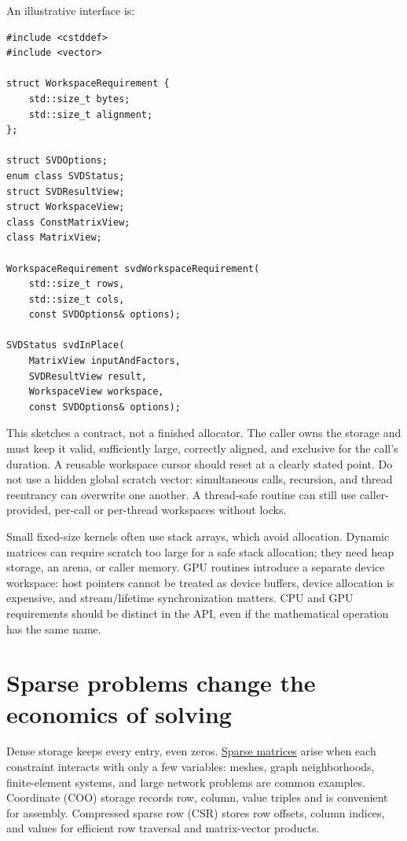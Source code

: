 An illustrative interface is:

\begin{verbatim}
#include <cstddef>
#include <vector>

struct WorkspaceRequirement {
    std::size_t bytes;
    std::size_t alignment;
};

struct SVDOptions;
enum class SVDStatus;
struct SVDResultView;
struct WorkspaceView;
class ConstMatrixView;
class MatrixView;

WorkspaceRequirement svdWorkspaceRequirement(
    std::size_t rows,
    std::size_t cols,
    const SVDOptions& options);

SVDStatus svdInPlace(
    MatrixView inputAndFactors,
    SVDResultView result,
    WorkspaceView workspace,
    const SVDOptions& options);
\end{verbatim}

This sketches a contract, not a finished allocator. The caller owns the storage and must keep it valid, sufficiently large, correctly aligned, and exclusive for the call's duration. A reusable workspace cursor should reset at a clearly stated point. Do not use a hidden global scratch vector: simultaneous calls, recursion, and thread reentrancy can overwrite one another. A thread-safe routine can still use caller-provided, per-call or per-thread workspaces without locks.

Small fixed-size kernels often use stack arrays, which avoid allocation. Dynamic matrices can require scratch too large for a safe stack allocation; they need heap storage, an arena, or caller memory. GPU routines introduce a separate device workspace: host pointers cannot be treated as device buffers, device allocation is expensive, and stream/lifetime synchronization matters. CPU and GPU requirements should be distinct in the API, even if the mathematical operation has the same name.

\section{Sparse problems change the economics of solving}\label{02-foundations-ii-ch038-sparse-problems-change-the-economics-of-solving}

\hypertarget{02-foundations-ii-ch038-sparse-problems-change-the-economics-of-solving}{}

Dense storage keeps every entry, even zeros. \hyperref[02-foundations-ii-ch038-sparse-storage-changes-the-cost-model]{Sparse matrices} arise when each constraint interacts with only a few variables: meshes, graph neighborhoods, finite-element systems, and large network problems are common examples. Coordinate (COO) storage records row, column, value triples and is convenient for assembly. Compressed sparse row (CSR) stores row offsets, column indices, and values for efficient row traversal and matrix-vector products.

